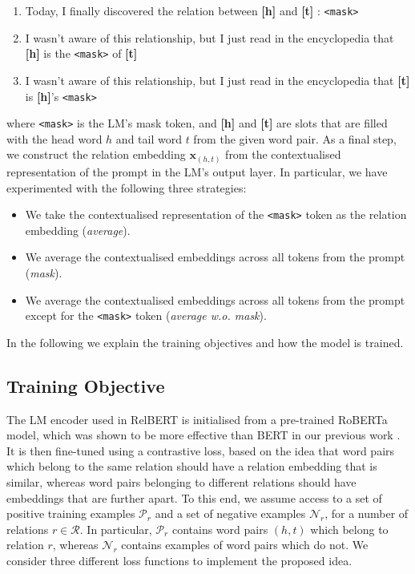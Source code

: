 \documentclass[3p]{elsarticle}
\begin{document}
{\begin{enumerate}
    \item Today, I finally discovered the relation between \textbf{[h]} and \textbf{[t]} : \texttt{<mask>}
    \item I wasn’t aware of this relationship, but I just read in the encyclopedia that \textbf{[h]} is the \texttt{<mask>} of \textbf{[t]}
    \item I wasn’t aware of this relationship, but I just read in the encyclopedia that \textbf{[t]} is \textbf{[h]}’s \texttt{<mask>}
\end{enumerate}
where \texttt{<mask>} is the LM's mask token, and \textbf{[h]} and \textbf{[t]} are slots that are filled with the head word $h$ and tail word $t$ from the given word pair. As a final step, we construct the relation embedding $\mathbf{x}_{(h,t)}$ from  the contextualised representation of the prompt in the LM's output layer. In particular, we have experimented with the following three strategies:
\begin{itemize}
\item We take the contextualised representation of the \texttt{<mask>} token as the relation embedding (\emph{average}).
\item We average the contextualised embeddings across all tokens from the prompt (\emph{mask}).
\item We average the contextualised embeddings across all tokens from the prompt except for the \texttt{<mask>} token (\emph{average w.o. mask}).
\end{itemize}
In the following we explain the training objectives and how the model is trained. 


\subsection{Training Objective}\label{sec:relbert:relational-knowledge-distillation-via-language-model-finetuning}
The LM encoder used in RelBERT is initialised from a pre-trained RoBERTa model, which was shown to be more effective than BERT in our previous work \cite{ushio-etal-2021-distilling}. It is then fine-tuned using a contrastive loss, based on the idea that word pairs which belong to the same relation should have a relation embedding that is similar, whereas word pairs belonging to different relations should have embeddings that are further apart. To this end, we assume access to a set of positive training examples $\mathcal{P}_r$ and a set of negative examples $\mathcal{N}_r$, for a number of relations $r\in \mathcal{R}$. In particular, $\mathcal{P}_r$ contains word pairs $(h,t)$ which belong to relation $r$, whereas $\mathcal{N}_r$ contains examples of word pairs which do not. We consider three different loss functions to implement the proposed idea.

}
\end{document}
